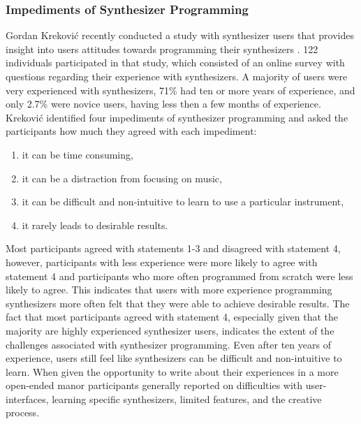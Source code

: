 \subsubsection{Impediments of Synthesizer Programming}
Gordan Krekovi\'{c} recently conducted a study with synthesizer users that provides insight into users attitudes towards programming their synthesizers \cite{krekovic2019insights}. 122 individuals participated in that study, which consisted of an online survey with questions regarding their experience with synthesizers. A majority of users were very experienced with synthesizers, 71\% had ten or more years of experience, and only 2.7\% were novice users, having less then a few months of experience. Krekovi\'{c} identified four impediments of synthesizer programming and asked the participants how much they agreed with each impediment:
\begin{enumerate}
    \item it can be time consuming,
    \item it can be a distraction from focusing on music,
    \item it can be difficult and non-intuitive to learn to use a particular instrument,
    \item it rarely leads to desirable results.
\end{enumerate}
Most participants agreed with statements 1-3 and disagreed with statement 4, however, participants with less experience were more likely to agree with statement 4 and participants who more often programmed from scratch were less likely to agree. This indicates that users with more experience programming synthesizers more often felt that they were able to achieve desirable results. The fact that most participants agreed with statement 4, especially given that the majority are highly experienced synthesizer users, indicates the extent of the challenges associated with synthesizer programming. Even after ten years of experience, users still feel like synthesizers can be difficult and non-intuitive to learn. When given the opportunity to write about their experiences in a more open-ended manor participants generally reported on difficulties with user-interfaces, learning specific synthesizers, limited features, and the creative process.

